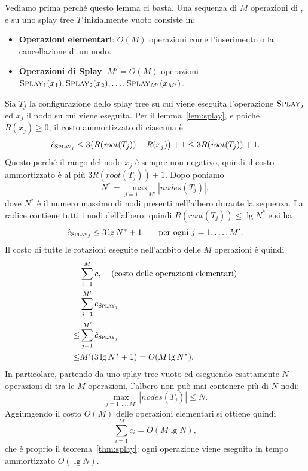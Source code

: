 Vediamo prima perché questo lemma ci basta. Una sequenza di $M$ operazioni di \Search, \Insert{} e \Delete{} su uno splay tree $T$ inizialmente vuoto consiste in:
\begin{itemize}
    \item \textbf{Operazioni elementari}: $O(M)$ operazioni come l'inserimento o la cancellazione di un nodo.
    \item \textbf{Operazioni di Splay}: $M' = O(M)$ operazioni $\textsc{Splay}_1(x_1), \textsc{Splay}_2(x_2), \dots, \textsc{Splay}_{M'}(x_{M'})$.
\end{itemize}
Sia $T_j$ la configurazione dello splay tree su cui viene eseguita l'operazione $\textsc{Splay}_j$ ed $x_j$ il nodo su cui viene eseguita. Per il lemma~\ref{lem:splay}, e poiché $R(x_j) \ge 0$, il costo ammortizzato di ciascuna è
\[
\hat{c}_{\textsc{Splay}_j} \le 3\big(R(\mathit{root}(T_j)) - R(x_j)\big) + 1 \le 3R(\mathit{root}(T_j)) + 1.
\]
Questo perché il rango del nodo $x_j$ è sempre non negativo, quindi il costo ammortizzato è al più $3R(\mathit{root}(T_j)) + 1$. Dopo poniamo
\[
N^* = \max_{j = 1, \dots, M'} |\mathit{nodes}(T_j)|,
\]
dove $N^*$ è il numero massimo di nodi presenti nell'albero durante la sequenza. La radice contiene tutti i nodi dell'albero, quindi $R(\mathit{root}(T_j)) \le \lg N^*$ e si ha
\[
\hat{c}_{\textsc{Splay}_j} \le 3\lg N^* + 1 \qquad \text{per ogni } j = 1, \dots, M'.
\]
Il costo di tutte le rotazioni eseguite nell'ambito delle $M$ operazioni è quindi
\begin{align*}
&\sum_{i=1}^{M} c_i - (\text{costo delle operazioni elementari}) \\
= &\sum_{j=1}^{M'} c_{\textsc{Splay}_j} \\ 
\le &\sum_{j=1}^{M'} \hat{c}_{\textsc{Splay}_j} \\ 
\le &M'(3\lg N^* + 1) = O(M \lg N^*).
\end{align*}
In particolare, partendo da uno splay tree vuoto ed eseguendo esattamente $N$ operazioni di \Insert{} tra le $M$ operazioni, l'albero non può mai contenere più di $N$ nodi:
\[
\max_{j = 1, \dots, M'} |\mathit{nodes}(T_j)| \le N.
\]
Aggiungendo il costo $O(M)$ delle operazioni elementari si ottiene quindi
\[
\sum_{i=1}^{M} c_i = O(M \lg N),
\]
che è proprio il teorema~\ref{thm:splay}: ogni operazione viene eseguita in tempo ammortizzato $O(\lg N)$.

